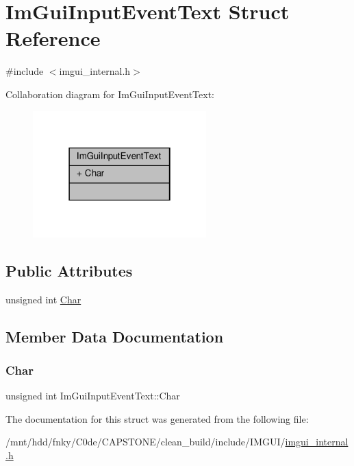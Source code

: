 \hypertarget{structImGuiInputEventText}{}\section{Im\+Gui\+Input\+Event\+Text Struct Reference}
\label{structImGuiInputEventText}


{\ttfamily \#include $<$imgui\+\_\+internal.\+h$>$}



Collaboration diagram for Im\+Gui\+Input\+Event\+Text\+:
\nopagebreak
\begin{figure}[H]
\begin{center}
\leavevmode
\includegraphics[width=190pt]{structImGuiInputEventText__coll__graph}
\end{center}
\end{figure}
\subsection*{Public Attributes}
\begin{DoxyCompactItemize}
\item 
unsigned int \hyperlink{structImGuiInputEventText_a746d36ebae9d10620c1400bf9cd6c14f}{Char}
\end{DoxyCompactItemize}


\subsection{Member Data Documentation}
\mbox{\label{structImGuiInputEventText_a746d36ebae9d10620c1400bf9cd6c14f}} 
\subsubsection{\texorpdfstring{Char}{Char}}
{\footnotesize\ttfamily unsigned int Im\+Gui\+Input\+Event\+Text\+::\+Char}



The documentation for this struct was generated from the following file\+:\begin{DoxyCompactItemize}
\item 
/mnt/hdd/fnky/\+C0de/\+C\+A\+P\+S\+T\+O\+N\+E/clean\+\_\+build/include/\+I\+M\+G\+U\+I/\hyperlink{imgui__internal_8h}{imgui\+\_\+internal.\+h}\end{DoxyCompactItemize}
